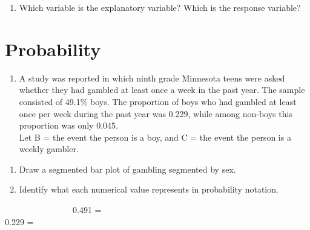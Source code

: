 \documentclass[
]{report}
\providecommand{\tightlist}{%
  \setlength{\itemsep}{0pt}\setlength{\parskip}{0pt}}
\begin{document}
\begin{enumerate}
\def\labelenumi{\arabic{enumi}.}
\setcounter{enumi}{7}
\tightlist
\item
  Which variable is the explanatory variable? Which is the response variable?
\end{enumerate}

\newpage

\hypertarget{probability}{%
\section{Probability}\label{probability}}

\begin{enumerate}
\def\labelenumi{\arabic{enumi}.}
\setcounter{enumi}{8}
\tightlist
\item
  A study was reported in which ninth grade Minnesota teens were asked whether they had gambled at least once a week in the past year. The sample consisted of 49.1\% boys. The proportion of boys who had gambled at least once per week during the past year was 0.229, while among non-boys this proportion was only 0.045.\\
  Let B = the event the person is a boy, and C = the event the person is a weekly gambler.
  \vspace{0.1in}
\end{enumerate}

\begin{enumerate}
\def\labelenumi{\alph{enumi}.}
\item
  Draw a segmented bar plot of gambling segmented by sex.
  \vspace{2in}
\item
  Identify what each numerical value represents in probability notation.
  \vspace{.1in}
\end{enumerate}

~~~~~~~~~~~~~~~~0.491 = \vspace{.2in}\\
\hspace*{0.333em}\hspace*{0.333em}\hspace*{0.333em}\hspace*{0.333em}\hspace*{0.333em}\hspace*{0.333em}\hspace*{0.333em}\hspace*{0.333em}\hspace*{0.333em}\hspace*{0.333em}\hspace*{0.333em}\hspace*{0.333em}\hspace*{0.333em}\hspace*{0.333em}\hspace*{0.333em}\hspace*{0.333em}0.229 =
\end{document}
